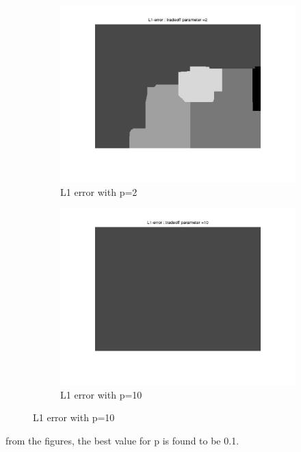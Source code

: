 \documentclass[fleqn]{article}
\begin{document}
\begin{figure}
\begin{subfigure}{0.5\textwidth}
\includegraphics[scale=0.2]{./pics/tsukuba_L1_error_p=2.jpg}
\caption{L1 error with p=2}
\end{subfigure}
 \begin{subfigure}{0.5\textwidth}
\includegraphics[scale=0.2]{./pics/tsukuba_L1_error_p=10.jpg}
\caption{L1 error with p=10}
\end{subfigure}
\end{figure}
from the figures, the best value for p is found to be 0.1.

\clearpage
\end{document}
